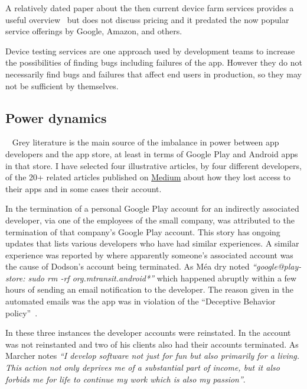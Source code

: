A relatively dated paper about the then current device farm services provides a useful overview~ but does not discuss pricing and it predated the now popular service offerings by Google, Amazon, and others. 

Device testing services are one approach used by development teams to increase the possibilities of finding bugs including failures of the app. However they do not necessarily find bugs and failures that affect end users in production, so they may not be sufficient by themselves.


\subsection{Power dynamics}~\label{rw-power-dynamics-topic}
Grey literature is the main source of the imbalance in power between app developers and the app store, at least in terms of Google Play and Android apps in that store. I have selected four illustrative articles, by four different developers, of the 20+ related articles published on \href{https://medium.com/}{Medium} %
about how they lost access to their apps and in some cases their account. 

In \textcite{martinez2019_google_just_terminated_our_startup_google_play_publisher_account_on_xmas_day} the termination of a personal Google Play account for an indirectly associated developer, via one of the employees of the small company, was attributed to the termination of that company's Google Play account. This story has ongoing updates that lists various developers who have had similar experiences. A similar experience was reported by \textcite{dodson2019_google_completely_terminated_our_new_business_etc} where apparently someone's associated account was the cause of Dodson's account being terminated. As Méa dry noted \emph{``google@play-store: sudo rm -rf org.mtransit.android*''} which happened abruptly within a few hours of sending an email notification to the developer. The reason given in the automated emails was the app was in violation of the ``Deceptive Behavior policy''~. 

In these three instances the developer accounts were reinstated. In \textcite{marcher2021_how_google_terminated-a-developer} the account was not reinstanted and two of his clients also had their accounts terminated. As Marcher notes \emph{``I develop software not just for fun but also primarily for a living. This action not only deprives me of a substantial part of income, but it also forbids me for life to continue my work which is also my passion''}. %

